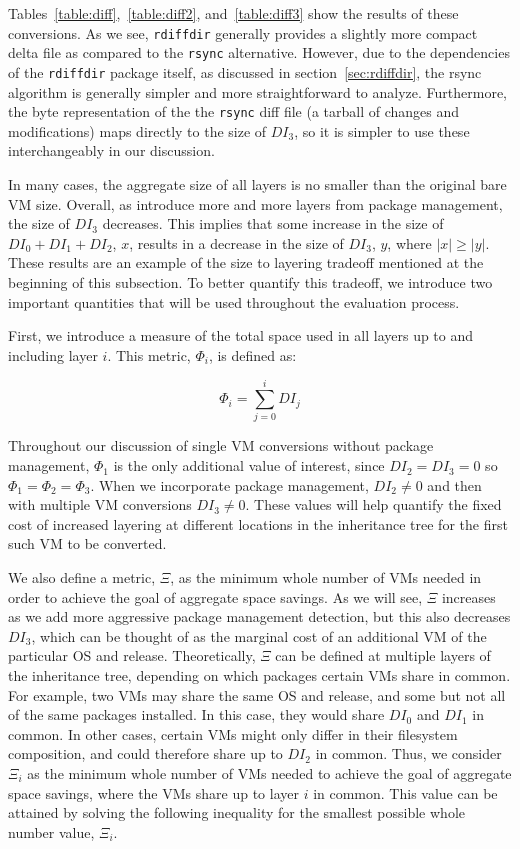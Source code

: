 Tables~\ref{table:diff},~\ref{table:diff2}, and~\ref{table:diff3} show the results of these conversions. As we see, \texttt{rdiffdir} generally provides a slightly more compact delta file as compared to the \texttt{rsync} alternative. However, due to the dependencies of the \texttt{rdiffdir} package itself, as discussed in section~\ref{sec:rdiffdir}, the rsync algorithm is generally simpler and more straightforward to analyze. Furthermore, the byte representation of the the \texttt{rsync} diff file (a tarball of changes and modifications) maps directly to the size of $DI_3$, so it is simpler to use these interchangeably in our discussion.

In many cases, the aggregate size of all layers is no smaller than the original bare VM size. Overall, as introduce more and more layers from package management, the size of $DI_3$ decreases. This implies that some increase in the size of $DI_0+DI_1 + DI_2$, $x$, results in a decrease in the size of $DI_3$, $y$, where $|x| \ge |y|$. These results are an example of the size to layering tradeoff mentioned at the beginning of this subsection. To better quantify this tradeoff, we introduce two important quantities that will be used throughout the evaluation process. 

First, we introduce a measure of the total space used in all layers up to and including layer $i$. This metric, $\Phi_i$, is defined as:

\begin{equation}
\Phi_i = \sum_{j=0}^i DI_j
\end{equation}

Throughout our discussion of single VM conversions without package management, $\Phi_1$ is the only additional value of interest, since $DI_2=DI_3=0$ so $\Phi_1=\Phi_2=\Phi_3$. When we incorporate package management, $DI_2 \neq 0$ and then with multiple VM conversions $DI_3 \neq 0$. These values will help quantify the fixed cost of increased layering at different locations in the inheritance tree for the first such VM to be converted. 

We also define a metric, $\Xi$, as the minimum whole number of VMs needed in order to achieve the goal of aggregate space savings. As we will see, $\Xi$ increases as we add more aggressive package management detection, but this also decreases $DI_3$, which can be thought of as the marginal cost of an additional VM of the particular OS and release. Theoretically, $\Xi$ can be defined at multiple layers of the inheritance tree, depending on which packages certain VMs share in common. For example, two VMs may share the same OS and release, and some but not all of the same packages installed. In this case, they would share $DI_0$ and $DI_1$ in common. In other cases, certain VMs might only differ in their filesystem composition, and could therefore share up to $DI_2$ in common. Thus, we consider $\Xi_i$ as the minimum whole number of VMs needed to achieve the goal of aggregate space savings, where the VMs share up to layer $i$ in common. This value can be attained by solving the following inequality for the smallest possible whole number value, $\Xi_i$.

